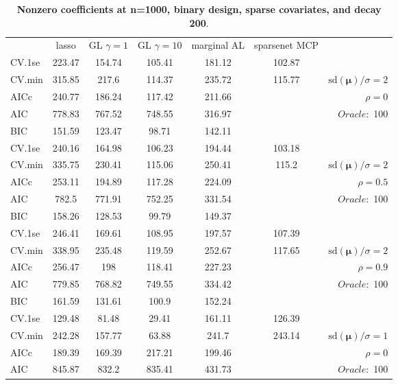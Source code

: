 \clearpage
\begin{table}\vspace{-.5cm}
\caption[l]{ { \bf Nonzero coefficients at n=1000, binary design, 
sparse covariates, and  decay  200}.}
\vspace{-.5cm}
\footnotesize{}
\begin{center}
\begin{tabular}{l*{5}{c}|r}
& lasso & GL $\gamma=1$ & GL $\gamma=10$ & marginal AL & sparsenet MCP  & \\
 \cline{1-7}
CV.1se & 223.47 & 154.74 & 105.41 & 181.12 & 102.87 & \\
CV.min & 315.85 & 217.6 & 114.37 & 235.72 & 115.77 &  $\mathrm{sd}(\mathbf{\mu})/\sigma=2$ \\
AICc & 240.77 & 186.24 & 117.42 & 211.66 & & $\rho=0$ \\
AIC & 778.83 & 767.52 & 748.55 & 316.97 & &  \multirow{2}{*}{$Oracle: $ 100} \\
BIC & 151.59 & 123.47 & 98.71 & 142.11 & &  \\
 \hline 
CV.1se & 240.16 & 164.98 & 106.23 & 194.44 & 103.18 & \\
CV.min & 335.75 & 230.41 & 115.06 & 250.41 & 115.2 &  $\mathrm{sd}(\mathbf{\mu})/\sigma=2$ \\
AICc & 253.11 & 194.89 & 117.28 & 224.09 & & $\rho=0.5$ \\
AIC & 782.5 & 771.91 & 752.25 & 331.54 & &  \multirow{2}{*}{$Oracle: $ 100} \\
BIC & 158.26 & 128.53 & 99.79 & 149.37 & &  \\
 \hline 
CV.1se & 246.41 & 169.61 & 108.95 & 197.57 & 107.39 & \\
CV.min & 338.95 & 235.48 & 119.59 & 252.67 & 117.65 &  $\mathrm{sd}(\mathbf{\mu})/\sigma=2$ \\
AICc & 256.47 & 198 & 118.41 & 227.23 & & $\rho=0.9$ \\
AIC & 779.85 & 768.82 & 749.55 & 334.42 & &  \multirow{2}{*}{$Oracle: $ 100} \\
BIC & 161.59 & 131.61 & 100.9 & 152.24 & &  \\
 \hline 
CV.1se & 129.48 & 81.48 & 29.41 & 161.11 & 126.39 & \\
CV.min & 242.28 & 157.77 & 63.88 & 241.7 & 243.14 &  $\mathrm{sd}(\mathbf{\mu})/\sigma=1$ \\
AICc & 189.39 & 169.39 & 217.21 & 199.46 & & $\rho=0$ \\
AIC & 845.87 & 832.2 & 835.41 & 431.73 & &  \multirow{2}{*}{$Oracle: $ 100} \\

\end{tabular}
\end{center}
\end{table}
